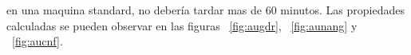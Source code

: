 en una maquina standard, no deber\'ia tardar mas de  60  minutos. Las propiedades calculadas se pueden observar en las figuras ~\ref{fig:augdr}, ~\ref{fig:aunang} y ~\ref{fig:aucnf}.

\begin{figure}[!ht]
\centering
{}
\end{figure}
